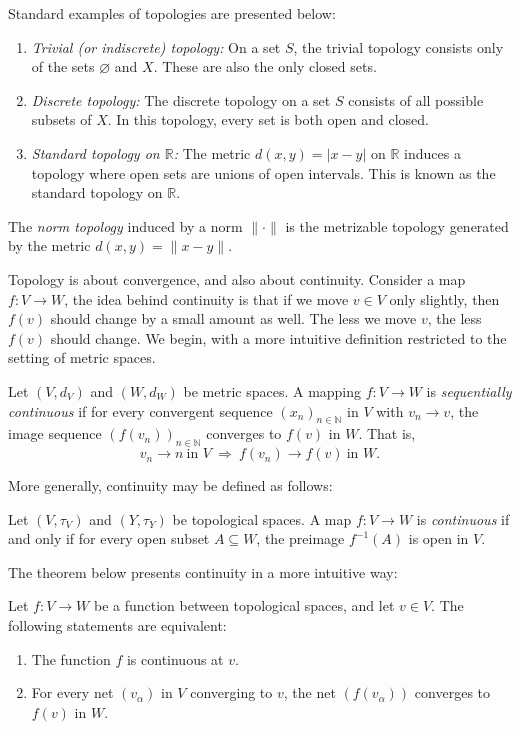 \begin{example}
Standard examples of topologies are presented below:
\begin{enumerate}
    \item \emph{Trivial (or indiscrete) topology:} On a set $S$, the trivial topology consists only of the sets $\varnothing$ and $X$. These are also the only closed sets.
    
    \item \emph{Discrete topology:} The discrete topology on a set $S$ consists of all possible subsets of $X$. In this topology, every set is both open and closed.
    
    \item \emph{Standard topology on $\mathbb{R}$:} The metric $d(x, y) = |x - y|$ on $\mathbb{R}$ induces a topology where open sets are unions of open intervals. This is known as the standard topology on $\mathbb{R}$.
\end{enumerate}
\end{example}

\begin{definition}
  The \emph{norm topology} induced by a norm $\|\cdot\|$ is the metrizable topology generated by the metric $d(x, y) = \|x - y\|$.
\end{definition}

Topology is about convergence, and also about continuity. Consider a  map $f \colon V \to W$, the idea behind continuity is that if we move $v \in V$ only slightly, then $f(v)$ should change by a small amount as well. The less we move $v$, the less $f(v)$ should change. We begin, with a more intuitive definition restricted to the setting of metric spaces.

\begin{definition}
Let $(V,d_V)$ and $(W,d_W)$ be metric spaces. A mapping $f \colon V \to W$ is \emph{sequentially continuous} if for every convergent sequence $(x_n)_{n\in\mathbb{N}}$ in $V$ with $v_n \to v$, the image sequence $(f(v_n))_{n\in\mathbb{N}}$ converges to $f(v)$ in $W$. That is,
\[
v_n \to n \ \text{in } V \ \Rightarrow \ f(v_n) \to f(v) \ \text{in } W.
\]
\end{definition}
More generally, continuity may be defined as follows:
\begin{definition}
  Let $(V, \tau_V)$ and $(Y, \tau_Y)$ be topological spaces. A map $f \colon V \to W$ is \emph{continuous} if and only if for every open subset $A \subseteq W$, the preimage $f^{-1}(A)$ is open in $V$.
\end{definition}
The theorem below presents continuity in a more intuitive way:
\begin{theorem} \cite[Theorem 2.28]{guide2006infinite} \label{def:continuidade_top}
  Let $f \colon V \to W$ be a function between topological spaces, and let $v \in V$. The following statements are equivalent:
\begin{enumerate}
    \item The function $f$ is continuous at $v$.
    \item For every net $(v_\alpha)$ in $V$ converging to $v$, the net $(f(v_\alpha))$ converges to $f(v)$ in $W$.
\end{enumerate}
\end{theorem}


